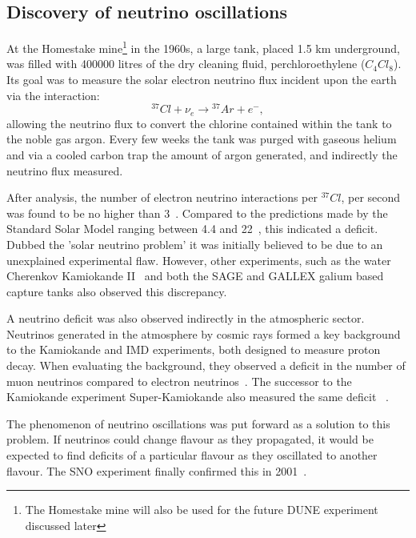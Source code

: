 \subsection{Discovery of neutrino oscillations} %
\label{sec:theory_history_neutrinos}

At the Homestake mine\footnote{The Homestake mine will also be used for the future DUNE experiment
    discussed later} in the 1960s, a large tank, placed 1.5 km underground, was filled with
400000 litres of the dry cleaning fluid, perchloroethylene ($C_{4}Cl_{8}$). Its goal was to
measure the solar electron neutrino flux incident upon the earth via the interaction:
\begin{equation} %
    {}^{37}Cl+\nu_{e}\rightarrow{}^{37}Ar+e^{-},
\end{equation} %
allowing the neutrino flux to convert the chlorine contained within the tank to the noble gas
argon. Every few weeks the tank was purged with gaseous helium and via a cooled carbon trap the
amount of argon generated, and indirectly the neutrino flux measured.

After analysis, the number of electron neutrino interactions per ${}^{37}Cl$, per second was found
to be no higher than 3~\cite{davis1968}. Compared to the predictions made by the Standard Solar
Model ranging between 4.4 and 22~\cite{bahcall1968}, this indicated a deficit. Dubbed the
'solar neutrino problem' it was initially believed to be due to an unexplained experimental flaw.
However, other experiments, such as the water Cherenkov Kamiokande II~\cite{hirata1989} and both
the SAGE and GALLEX galium based capture tanks also observed this discrepancy.

A neutrino deficit was also observed indirectly in the atmospheric sector. Neutrinos generated in
the atmosphere by cosmic rays formed a key background to the Kamiokande and IMD experiments, both
designed to measure proton decay. When evaluating the background, they observed a deficit in the
number of muon neutrinos compared to electron neutrinos~\cite{hirata1988, becker1992}. The
successor to the Kamiokande experiment Super-Kamiokande also measured the same deficit
~\cite{kajita1999}.

The phenomenon of neutrino oscillations was put forward as a solution to this problem. If
neutrinos could change flavour as they propagated, it would be expected to find deficits of a
particular flavour as they oscillated to another flavour. The SNO experiment finally confirmed
this in 2001~\cite{ahmad2002}.

